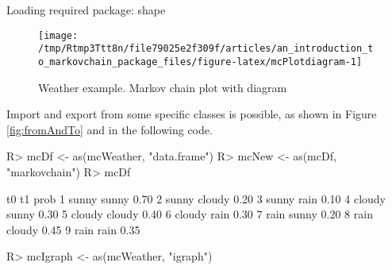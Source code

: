 \documentclass[
  nojss]{jss}
\begin{document}
\begin{CodeChunk}

\begin{CodeOutput}
Loading required package: shape
\end{CodeOutput}
\begin{figure}

{\centering \texttt{[image: /tmp/Rtmp3Ttt8n/file79025e2f309f/articles/an\_introduction\_to\_markovchain\_package\_files/figure-latex/mcPlotdiagram-1]} 

}

\caption[Weather example]{Weather example. Markov chain plot with diagram}\label{fig:mcPlotdiagram}
\end{figure}
\end{CodeChunk}

Import and export from some specific classes is possible, as shown in Figure \ref{fig:fromAndTo} and in the following code.

\begin{CodeChunk}

\begin{CodeInput}
R> mcDf <- as(mcWeather, "data.frame")
R> mcNew <- as(mcDf, "markovchain")
R> mcDf
\end{CodeInput}

\begin{CodeOutput}
      t0     t1 prob
1  sunny  sunny 0.70
2  sunny cloudy 0.20
3  sunny   rain 0.10
4 cloudy  sunny 0.30
5 cloudy cloudy 0.40
6 cloudy   rain 0.30
7   rain  sunny 0.20
8   rain cloudy 0.45
9   rain   rain 0.35
\end{CodeOutput}

\begin{CodeInput}
R> mcIgraph <- as(mcWeather, "igraph")
\end{CodeInput}
\end{CodeChunk}
\end{document}
